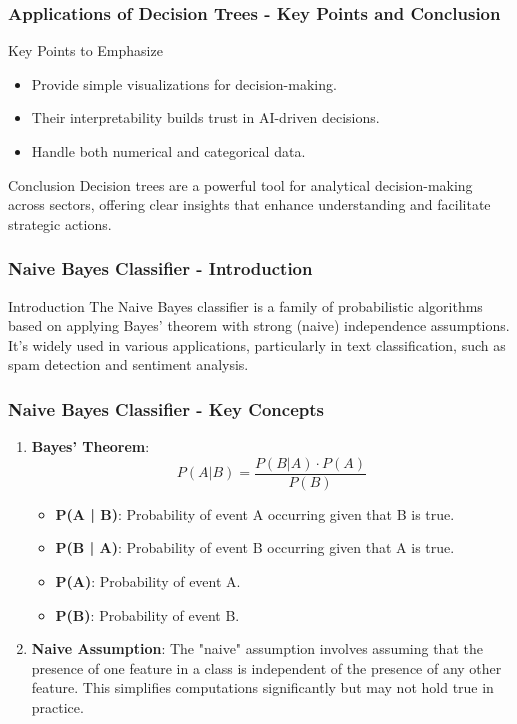 \documentclass[aspectratio=169]{beamer}
\begin{document}
\begin{frame}[fragile]
  \frametitle{Applications of Decision Trees - Key Points and Conclusion}
  \begin{block}{Key Points to Emphasize}
    \begin{itemize}
      \item Provide simple visualizations for decision-making.
      \item Their interpretability builds trust in AI-driven decisions.
      \item Handle both numerical and categorical data.
    \end{itemize}
  \end{block}

  \begin{block}{Conclusion}
    Decision trees are a powerful tool for analytical decision-making across sectors, offering clear insights that enhance understanding and facilitate strategic actions.
  \end{block}
\end{frame}

\begin{frame}[fragile]
  \frametitle{Naive Bayes Classifier - Introduction}
  \begin{block}{Introduction}
    The Naive Bayes classifier is a family of probabilistic algorithms based on applying Bayes' theorem with strong (naive) independence assumptions. 
    It's widely used in various applications, particularly in text classification, such as spam detection and sentiment analysis.
  \end{block}
\end{frame}

\begin{frame}[fragile]
  \frametitle{Naive Bayes Classifier - Key Concepts}
  \begin{enumerate}
    \item \textbf{Bayes' Theorem}: 
    \begin{equation}
      P(A | B) = \frac{P(B | A) \cdot P(A)}{P(B)}
    \end{equation}
    \begin{itemize}
      \item \textbf{P(A | B)}: Probability of event A occurring given that B is true.
      \item \textbf{P(B | A)}: Probability of event B occurring given that A is true.
      \item \textbf{P(A)}: Probability of event A.
      \item \textbf{P(B)}: Probability of event B.
    \end{itemize}

    \item \textbf{Naive Assumption}: 
    The "naive" assumption involves assuming that the presence of one feature in a class is independent of the presence of any other feature. 
    This simplifies computations significantly but may not hold true in practice.
  \end{enumerate}
\end{frame}
\end{document}
